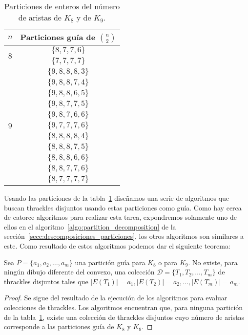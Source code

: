     \begin{table}[t]
      \centering
      \begin{tabular}{|c|c|}
        \hline
        $n$                       & Particiones guía de $\displaystyle\binom{n}{2}$ \\ \hline\hline
        \multirow{2}{*}{$ 8 $}    & $\{8,7,7,6\}$ \\ \cline{2-2}
                                  & $\{7,7,7,7\}$ \\ \hline
        \multirow{11}{*}{$ 9 $}   &$\{9,8,8,8,3\}$ \\ \cline{2-2}
                                  &$\{9,8,8,7,4\}$ \\ \cline{2-2}
                                  &$\{9,8,8,6,5\}$ \\ \cline{2-2}
                                  &$\{9,8,7,7,5\}$ \\ \cline{2-2}
                                  &$\{9,8,7,6,6\}$ \\ \cline{2-2}
                                  &$\{9,7,7,7,6\}$ \\ \cline{2-2}
                                  &$\{8,8,8,8,4\}$ \\ \cline{2-2}
                                  &$\{8,8,8,7,5\}$ \\ \cline{2-2}
                                  &$\{8,8,8,6,6\}$ \\ \cline{2-2}
                                  &$\{8,8,7,7,6\}$ \\ \cline{2-2}
                                  &$\{8,7,7,7,7\}$ \\ \hline
      \end{tabular}
      \caption{Particiones de enteros del número de aristas de $K_8$ y de $K_9$. }
      \label{tabla:particionesk8k9}
    \end{table}

    Usando las particiones de la tabla~\ref{tabla:particionesk8k9} diseñamos
    una serie de algoritmos que buscan thrackles disjuntos usando estas particiones como guía.
    Como hay cerca de catorce algoritmos para realizar esta tarea, expondremos solamente
    uno de ellos en el algoritmo~\ref{algo:partition_decomposition} de la
    sección~\ref{secc:descomposiciones_particiones}, los
    otros algoritmos son similares a este. Como resultado de estos algoritmos podemos dar el
    siguiente teorema:
    \begin{theorem}\label{teorema:particiones}
      Sea $P=\{a_1,a_2,\dots,a_m\}$ una partición guía para $K_8$ o para $K_9$. No existe, para
      ningún dibujo diferente del convexo, una colección $\mathcal{D}=\{T_1,T_2,\dots,T_m\}$ de
      thrackles disjuntos tales que $|E(T_1)|=a_1,|E(T_2)|=a_2,\dots,|E(T_m)|=a_m$.
    \end{theorem}
    \begin{proof}
      Se sigue del resultado de la ejecución de los algoritmos para evaluar colecciones de
      thrackles. Los algoritmos encuentran que, para ninguna partición de la
      tabla~\ref{tabla:particionesk8k9}, existe una colección de thrackles disjuntos cuyo número de
      aristas corresponde a las particiones guía de $K_8$ y $K_9$.
    \end{proof}

